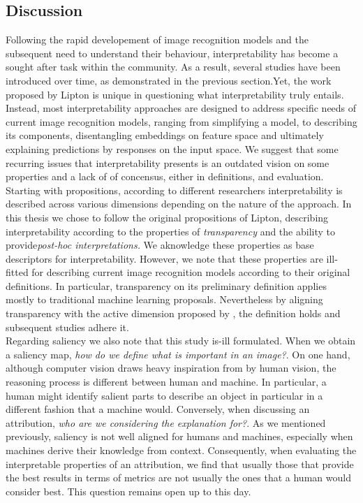 \subsection{Discussion}
\label{sec:rel_interp_discussion}
Following the rapid developement of image recognition models and the subsequent need to understand 
their behaviour, interpretability has become a sought after task within the community. As a result, 
several studies have been introduced over time, as demonstrated in the previous section.Yet, the 
work proposed by Lipton is unique in questioning what interpretability truly entails. 
Instead, most interpretability approaches are designed to address specific needs of current image 
recognition models, ranging from simplifying a model, to describing its components, disentangling 
embeddings on feature space and ultimately explaining predictions by responses on the input space. 
We suggest that some recurring issues that interpretability presents is an outdated vision on some 
properties and a lack of of concensus, either in definitions, and evaluation.\\

\noindent Starting with propositions, according to different researchers interpretability is 
described across various dimensions depending on the nature of the approach. In this thesis we 
chose to follow the original propositions of Lipton, describing interpretability according to the 
properties of \emph{transparency} and the ability to provide\emph{post-hoc interpretations.} We 
aknowledge these properties as base descriptors for interpretability. However, we note that these 
properties are ill-fitted for describing current image recognition models according 
to their original definitions. In particular, transparency on its preliminary definition applies 
mostly to traditional machine learning proposals. Nevertheless by aligning transparency with 
the active dimension proposed by \cite{zhang2021survey}, the definition holds and subsequent 
studies adhere it.\\

\noindent Regarding saliency we also note that this study is-ill formulated. When we obtain a 
saliency map, \emph{how do we define what is important in an image?}. On one hand, although computer  
vision draws heavy inspiration from by human vision, the reasoning process is different between 
human and machine. In particular, a human might identify salient parts to describe an object in 
particular in a different fashion that a machine would. Conversely, when discussing an attribution, 
\emph{who are we considering the explanation for?}. As we mentioned previously, saliency is not 
well aligned for humans and machines, especially when machines derive their knowledge from context. 
Consequently, when evaluating the interpretable properties of an attribution, we find that usually 
those that provide the best results in terms of metrics are not usually the ones that a human 
would consider best. This question remains open up to this day.\\

